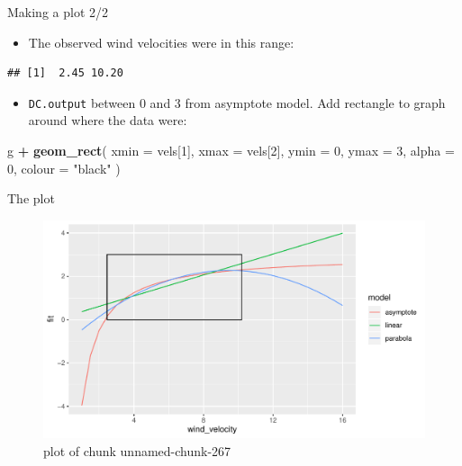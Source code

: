 \documentclass[
  ignorenonframetext,
]{beamer}
\newenvironment{Shaded}{\begin{snugshade}}{\end{snugshade}}
\newcommand{\DataTypeTok}[1]{\textcolor[rgb]{0.13,0.29,0.53}{#1}}
\newcommand{\DecValTok}[1]{\textcolor[rgb]{0.00,0.00,0.81}{#1}}
\newcommand{\KeywordTok}[1]{\textcolor[rgb]{0.13,0.29,0.53}{\textbf{#1}}}
\newcommand{\NormalTok}[1]{#1}
\newcommand{\OperatorTok}[1]{\textcolor[rgb]{0.81,0.36,0.00}{\textbf{#1}}}
\newcommand{\StringTok}[1]{\textcolor[rgb]{0.31,0.60,0.02}{#1}}
\providecommand{\tightlist}{%
  \setlength{\itemsep}{0pt}\setlength{\parskip}{0pt}}
\begin{document}
\begin{frame}[fragile]{Making a plot 2/2}
\protect\hypertarget{making-a-plot-22}{}

\begin{itemize}
\tightlist
\item
  The observed wind velocities were in this range:
\end{itemize}

\begin{Shaded}
\end{Shaded}

\begin{verbatim}
## [1]  2.45 10.20
\end{verbatim}

\begin{itemize}
\tightlist
\item
  \texttt{DC.output} between 0 and 3 from asymptote model. Add rectangle
  to graph around where the data were:
\end{itemize}

\begin{Shaded}
\begin{Highlighting}[]
\NormalTok{g }\OperatorTok{+}\StringTok{ }\KeywordTok{geom_rect}\NormalTok{(}
  \DataTypeTok{xmin =}\NormalTok{ vels[}\DecValTok{1}\NormalTok{], }\DataTypeTok{xmax =}\NormalTok{ vels[}\DecValTok{2}\NormalTok{], }\DataTypeTok{ymin =} \DecValTok{0}\NormalTok{, }\DataTypeTok{ymax =} \DecValTok{3}\NormalTok{,}
  \DataTypeTok{alpha =} \DecValTok{0}\NormalTok{, }\DataTypeTok{colour =} \StringTok{"black"}
\NormalTok{)}
\end{Highlighting}
\end{Shaded}

\end{frame}

\begin{frame}{The plot}
\protect\hypertarget{the-plot-1}{}

\begin{figure}
\centering
\includegraphics{figure/unnamed-chunk-267-1.pdf}
\caption{plot of chunk unnamed-chunk-267}
\end{figure}

\end{frame}
\end{document}
